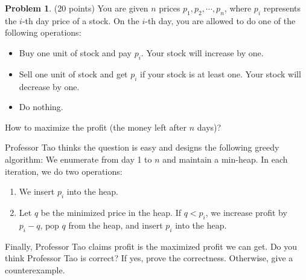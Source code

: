 \documentclass{article}
\theoremstyle{definition}
\newtheorem{prob}{Problem}
\begin{document}
	\begin{prob}
		(20 points) You are given $n$ prices $p_{1}, p_{2}, \cdots, p_{n}$, where $p_{i}$ represents the $i$-th day price of a stock. On the $i$-th day, you are allowed to do one of the following operations:
	
	\begin{itemize}
	\item Buy one unit of stock and pay $p_{i}$. Your stock will increase by one.
	
	\item Sell one unit of stock and get $p_{i}$ if your stock is at least one. Your stock will decrease by one.
	
	\item Do nothing.
	
	\end{itemize}
	
	How to maximize the profit (the money left after $n$ days)?
	
	Professor Tao thinks the question is easy and designs the following greedy algorithm: We enumerate from day 1 to $n$ and maintain a min-heap. In each iteration, we do two operations:
	
	\begin{enumerate}
	\item We insert $p_{i}$ into the heap.
	
	\item Let $q$ be the minimized price in the heap. If $q<p_{i}$, we increase profit by $p_{i}-q$, pop $q$ from the heap, and insert $p_{i}$ into the heap.
	
	\end{enumerate}
	
	Finally, Professor Tao claims profit is the maximized profit we can get. Do you think Professor Tao is correct? If yes, prove the correctness. Otherwise, give a counterexample. 
	
	\end{prob}
\end{document}
